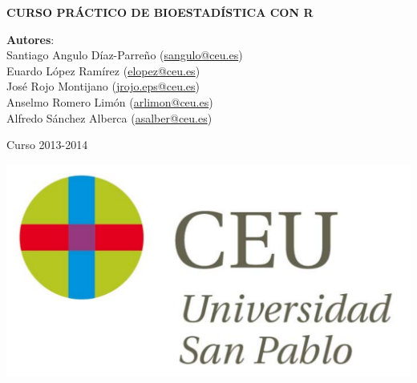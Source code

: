 \documentclass[a4paper,openright,twoside]{report}
\begin{document}
\begin{titlepage}
\vspace*{5cm}
\begin{center}
{\huge \bf CURSO PRÁCTICO DE BIOESTADÍSTICA CON R\par}
\vspace{0.5cm}
{\large \noindent 
\textbf{Autores}: \\
 Santiago Angulo Díaz-Parreño (\url{sangulo@ceu.es})\\
 Euardo López Ramírez (\url{elopez@ceu.es})\\
 José Rojo Montijano (\url{jrojo.eps@ceu.es})\\
 Anselmo Romero Limón (\url{arlimon@ceu.es})\\
Alfredo Sánchez Alberca (\url{asalber@ceu.es})
}

\vspace{0.5cm}
{\large Curso 2013-2014}

\vspace{1cm}
 \includegraphics[scale=0.3]{img/logo_uspceu_01}
\end{center}
\end{titlepage}



\renewcommand{\thepage}{\roman{page}}
\setcounter{page}{1} 
\thispagestyle{plain}
\tableofcontents
\cleardoublepage
\renewcommand{\thepage}{\arabic{page}}
\setcounter{page}{1}










% 
% 
% 
% 
%  
% 
%
\end{document}
